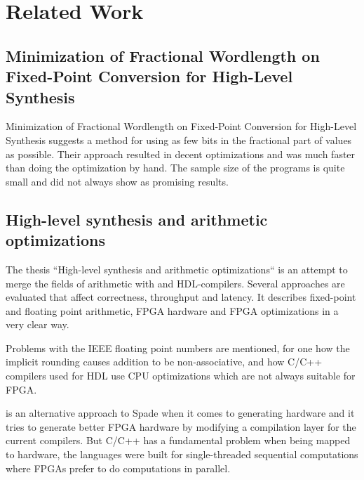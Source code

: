 \documentclass[msc,lith,english]{liuthesis}
\begin{document}




\chapter{Related Work}

\section{Minimization of Fractional Wordlength on Fixed-Point Conversion for High-Level Synthesis}
Minimization of Fractional Wordlength on Fixed-Point Conversion for High-Level Synthesis suggests a method for using as few bits in the fractional part of values as possible. Their approach resulted in decent optimizations and was much faster than doing the optimization by hand. The sample size of the programs is quite small and did not always show as promising results.

\cite{src:MinOfFrac}

\section{High-level synthesis and arithmetic optimizations}
The thesis ``High-level synthesis and arithmetic optimizations`` is an attempt to merge the fields of arithmetic with and HDL-compilers. Several approaches are evaluated that affect correctness, throughput and latency. It describes fixed-point and floating point arithmetic, FPGA hardware and FPGA optimizations in a very clear way.

Problems with the IEEE floating point numbers are mentioned, for one how the implicit rounding causes addition to be non-associative, and how C/C++ compilers used for HDL use CPU optimizations which are not always suitable for FPGA.

\citeauthor{src:HLSandOpt} is an alternative approach to Spade when it comes to generating hardware and it tries to generate better FPGA hardware by modifying a compilation layer for the current compilers. But C/C++ has a fundamental problem when being mapped to hardware, the languages were built for single-threaded sequential computations where FPGAs prefer to do computations in parallel.
\end{document}
